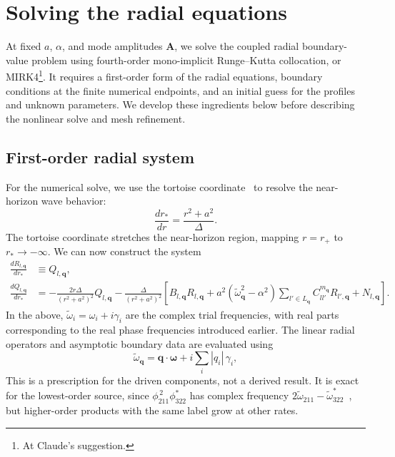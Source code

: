 \documentclass[11pt]{article}
\newcommand{\ON}[1]{ \textcolor{violet}{(ON: #1)} }
\begin{document}
\section{Solving the radial equations}


At fixed $a$, $\alpha$, and mode amplitudes $\mathbf A$, we solve the coupled radial boundary-value problem using fourth-order mono-implicit Runge–Kutta collocation, or MIRK4\footnote{At Claude's suggestion.}. It requires a first-order form of the radial equations, boundary conditions at the finite numerical endpoints, and an initial guess for the profiles and unknown parameters. We develop these ingredients below before describing the nonlinear solve and mesh refinement.

\subsection{First-order radial system}
For the numerical solve, we use the tortoise coordinate~\cite{Omiya_2022,witte2025,Baryakhtar_2021} to resolve the near-horizon wave behavior:
\begin{equation}
    \frac{dr_*}{dr}=\frac{r^2+a^2}{\Delta}.
\end{equation}
The tortoise coordinate stretches the near-horizon region, mapping $r = r_+$ to $r_* \rightarrow -\infty$. We can now construct the system
\begin{align}
    \frac{dR_{l,\mathbf{q}}}{dr_*} &\equiv Q_{l,\mathbf{q}}, \\
    \frac{dQ_{l,\mathbf{q}}}{dr_*} &= -\frac{2r\Delta}{(r^2+a^2)^2} Q_{l,\mathbf{q}} - \frac{\Delta}{(r^2+a^2)^2} \left[B_{l,\mathbf{q}}R_{l,\mathbf{q}} + a^2 (\tilde{\omega}_\mathbf{q}^2-\alpha^2) \sum_{l'\in L_\mathbf{q}} C_{ll'}^{m_\mathbf{q}} R_{l',\mathbf{q}} + N_{l, \mathbf{q}}\right].
\end{align}
In the above, $\tilde{\omega}_i=\omega_i+i\gamma_i$ are the complex trial frequencies, with real parts corresponding to the real phase frequencies introduced earlier. The linear radial operators and asymptotic boundary data are evaluated using
\begin{equation}
    \tilde{\omega}_{\mathbf q} = \mathbf q\cdot\boldsymbol{\omega} + i\sum_i |q_i|\,\gamma_i ,
\end{equation}
This is a prescription for the driven components, not a derived result. It is exact for the lowest-order source, since $\phi_{211}^{\,2}\phi_{322}^{*}$ has complex frequency $2\tilde\omega_{211}-\tilde\omega_{322}^{*}$~\cite{Omiya_2022}, but higher-order products with the same label grow at other rates.
\end{document}
